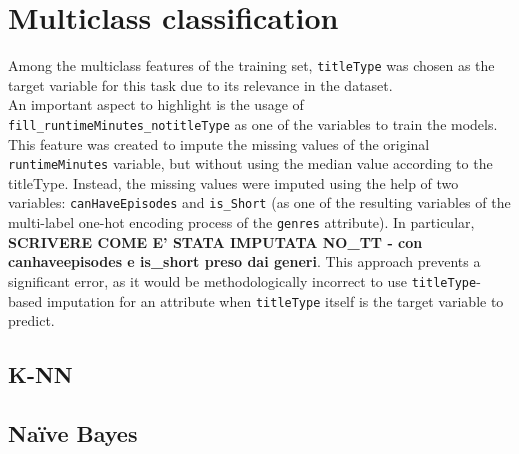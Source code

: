 \section{Multiclass classification}\label{sec:multiclass_classification}
Among the multiclass features of the training set, \texttt{titleType} 
was chosen as the target variable for this task due to its relevance in the dataset.\\
An important aspect to highlight is the usage of \texttt{fill\_runtimeMinutes\_notitleType}
as one of the variables to train the models. 
This feature was created to impute the missing values of the original \texttt{runtimeMinutes} variable,
but without using the median value according to the titleType. Instead, the missing values were imputed using the help of two variables: \texttt{canHaveEpisodes} and \texttt{is\_Short}
(as one of the resulting variables of the multi-label one-hot encoding process of the \texttt{genres} attribute).
In particular, 
\textbf{SCRIVERE COME E' STATA IMPUTATA NO\_TT - con canhaveepisodes e is\_short preso dai generi}.
This approach prevents a significant error, as it would be methodologically incorrect to use \texttt{titleType}-based 
imputation for an attribute when \texttt{titleType} itself is the target variable to predict.
\subsection*{K-NN}
\subsection*{Naïve Bayes}
